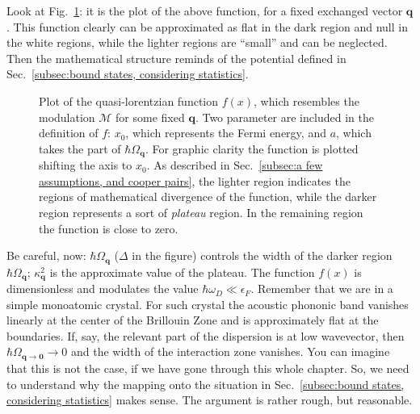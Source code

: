 Look at Fig.~\ref{fig:quasi-lorentzian function bcs}: it is the plot of the above function, for a fixed exchanged vector $\mathbf{q}$.
This function clearly can be approximated as flat in the dark region and null in the white regions, while the lighter regions are ``small'' and can be neglected. Then the mathematical structure reminds of the potential defined in Sec.~\ref{subsec:bound states, considering statistics}.

\begin{figure}
	\centering
	
	\caption{Plot of the quasi-lorentzian function $f(x)$, which resembles the modulation $\mathcal{M}$ for some fixed $\mathbf{q}$. Two parameter are included in the definition of $f$: $x_0$, which represents the Fermi energy, and $a$, which takes the part of $\hbar\Omega_\mathbf{q}$. For graphic clarity the function is plotted shifting the axis to $x_0$. As described in Sec.~\ref{subsec:a few assumptions, and cooper pairs}, the lighter region indicates the regions of mathematical divergence of the function, while the darker region represents a sort of \textit{plateau} region. In the remaining region the function is close to zero.}
	\label{fig:quasi-lorentzian function bcs}
\end{figure}

Be careful, now: $\hbar\Omega_\mathbf{q}$ ($\Delta$ in the figure) controls the width of the darker region $\hbar\Omega_\mathbf{q}$; $\kappa_\mathbf{q}^2$ is the approximate value of the plateau. The function $f(x)$ is dimensionless and modulates the value $\hbar\omega_D \ll \epsilon_F$.
Remember that we are in a simple monoatomic crystal. For such crystal the acoustic phononic band vanishes linearly at the center of the Brillouin Zone and is approximately flat at the boundaries. If, say, the relevant part of the dispersion is at low wavevector, then $\hbar\Omega_{\mathbf{q}\to\mathbf{0}}\to0$ and the width of the interaction zone vanishes. You can imagine that this is not the case, if we have gone through this whole chapter.
So, we need to understand why the mapping onto the situation in Sec.~\ref{subsec:bound states, considering statistics} makes sense. The argument is rather rough, but reasonable.

